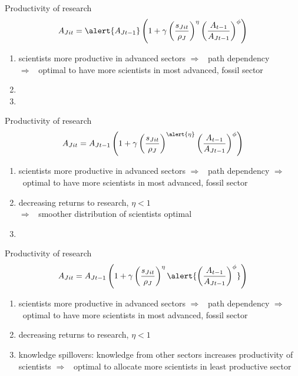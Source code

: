 \documentclass[11pt,aspectratio=169]{beamer}
\newcommand{\ar}{$\Rightarrow$ \ }
\begin{document}
\begin{frame}{Productivity of research}
\large
\begin{align*}
		A_{Jit}=\alert{A_{Jt-1}}\left(1+\gamma\left(\frac{s_{Jit}}{\rho_J}\right)^\eta\left(\frac{A_{t-1}}{A_{Jt-1}}\right)^\phi\right)
\end{align*}
\normalsize
\begin{enumerate}
		\item \alert{scientists more productive in advanced sectors \ar path dependency}\\ \ar optimal to have more scientists in most advanced, fossil sector 
	\item[] %
	\item[] %
\end{enumerate}
\end{frame}

\addtocounter{framenumber}{-1}
\begin{frame}{Productivity of research}
	\large
	\begin{align*}
		A_{Jit}={A_{Jt-1}}\left(1+\gamma\left(\frac{s_{Jit}}{\rho_J}\right)^{\alert{\eta}}\left(\frac{A_{t-1}}{A_{Jt-1}}\right)^\phi\right)
	\end{align*}
\normalsize
	\begin{enumerate}
		\item scientists more productive in advanced sectors \ar path dependency \ar optimal to have more scientists in most advanced, fossil sector 
		\item \alert{decreasing returns to research, $\eta<1$} \\ \ar smoother distribution of scientists optimal
		\item[] %
	\end{enumerate}
\end{frame}

\addtocounter{framenumber}{-1}
\begin{frame}{Productivity of research}
	\large
	\begin{align*}
		A_{Jit}={A_{Jt-1}}\left(1+\gamma\left(\frac{s_{Jit}}{\rho_J}\right)^\eta\alert{\left(\frac{A_{t-1}}{A_{Jt-1}}\right)^\phi}\right)
	\end{align*}
\normalsize
	\begin{enumerate}
		\item scientists more productive in advanced sectors \ar path dependency \ar optimal to have more scientists in most advanced, fossil sector 
		\item decreasing returns to research, $\eta<1$
		\item \alert{knowledge spillovers:} knowledge from other sectors increases productivity of scientists
	 \ar optimal to allocate more scientists in least productive sector	
	\end{enumerate}
\end{frame}
\end{document}
